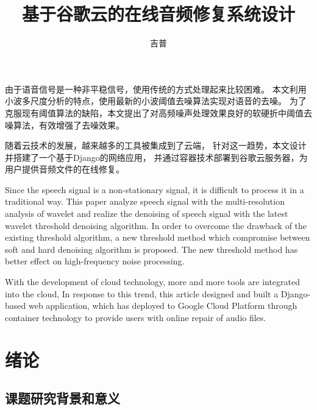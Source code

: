 \documentclass{morningstar}
\title{基于谷歌云的在线音频修复系统设计}
\author{吉普}
\begin{document}
\setfontformat
\makecover

\clearpage

\showcntitle


由于语音信号是一种非平稳信号，使用传统的方式处理起来比较困难。
本文利用小波多尺度分析的特点，使用最新的小波阈值去噪算法实现对语音的去噪。
为了克服现有阈值算法的缺陷，本文提出了对高频噪声处理效果良好的软硬折中阈值去噪算法，有效增强了去噪效果。

随着云技术的发展，越来越多的工具被集成到了云端，
针对这一趋势，本文设计并搭建了一个基于Django的网络应用，
并通过容器技术部署到谷歌云服务器，为用户提供音频文件的在线修复。    


\startfrontpart

\clearpage

\showentitle


Since the speech signal is a non-stationary signal, it is difficult to process it in a traditional way.
This paper analyze speech signal with the multi-resolution analysis of wavelet and realize the denoising of speech signal with the latest wavelet threshold denoising algorithm.
In order to overcome the drawback of the existing threshold algorithm, a new threshold method which compromise between soft and hard denoising algorithm is proposed. The new threshold method has better effect on high-frequency noise processing.

With the development of cloud technology, more and more tools are integrated into the cloud,
In response to this trend, this article designed and built a Django-based web application,
which has deployed to Google Cloud Platform through container technology to provide users with online repair of audio files.




\clearpage
\tableofcontents



\clearpage
\startmainpart
\section{绪论}
\subsection{课题研究背景和意义}
\end{document}
